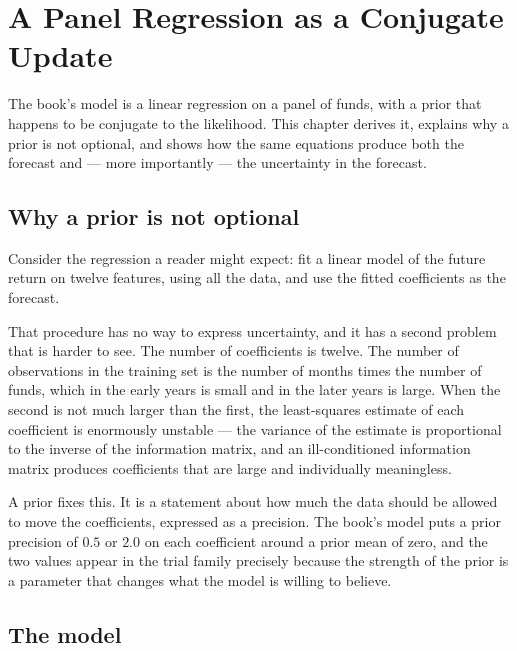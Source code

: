 
\chapter{A Panel Regression as a Conjugate Update}
\label{ch:conjugate}

The book's model is a linear regression on a panel of funds, with a prior
that happens to be conjugate to the likelihood. This chapter derives it,
explains why a prior is not optional, and shows how the same equations
produce both the forecast and --- more importantly --- the uncertainty in
the forecast.

\section{Why a prior is not optional}

Consider the regression a reader might expect: fit a linear model of the
future return on twelve features, using all the data, and use the fitted
coefficients as the forecast.

That procedure has no way to express uncertainty, and it has a second
problem that is harder to see. The number of coefficients is twelve. The
number of observations in the training set is the number of months times
the number of funds, which in the early years is small and in the later
years is large. When the second is not much larger than the first, the
least-squares estimate of each coefficient is enormously unstable --- the
variance of the estimate is proportional to the inverse of the
information matrix, and an ill-conditioned information matrix produces
coefficients that are large and individually meaningless.

A prior fixes this. It is a statement about how much the data should be
allowed to move the coefficients, expressed as a precision. The book's
model puts a prior precision of \(0.5\) or \(2.0\) on each coefficient
around a prior mean of zero, and the two values appear in the trial family
precisely because the strength of the prior is a parameter that changes
what the model is willing to believe.

\section{The model}

